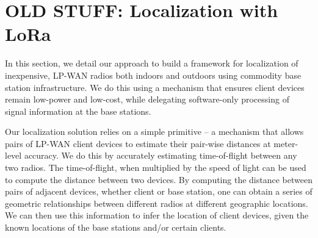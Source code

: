\section{OLD STUFF: Localization with LoRa}
\label{sec:localization}




In this section, we detail our approach to build a framework for localization of inexpensive, LP-WAN radios both indoors and outdoors using commodity base station infrastructure. We do this using a mechanism that ensures client devices remain low-power and low-cost, while delegating software-only processing of signal information at the base stations. 

Our localization solution relies on a simple primitive -- a mechanism that allows pairs of LP-WAN client devices to estimate their pair-wise distances at meter-level accuracy. We do this by accurately estimating time-of-flight between any two radios. The time-of-flight, when multiplied by the speed of light can be used to compute the distance between two devices. By computing the distance between pairs of adjacent devices, whether client or base station, one can obtain a series of geometric relationships between different radios at different geographic locations. We can then use this information to infer the location of client devices, given the known locations of the base stations and/or certain clients.  

